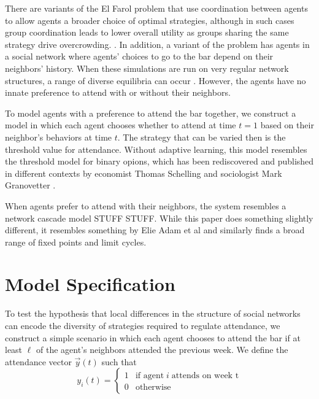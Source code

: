 \documentclass[12pt]{article}
\begin{document}
There are variants of the El Farol problem that use coordination between agents to allow agents a broader choice of optimal strategies, although in such cases group coordination leads to lower overall utility as groups sharing the same strategy drive overcrowding. \cite{collins:2017} \cite{wilensky:2015}.  In addition, a variant of the problem has agents in a social network where agents' choices to go to the bar depend on their neighbors' history.   When these simulations are run on very regular network structures, a range of diverse equilibria can occur \cite{chen:2012}.  However, the agents have no innate preference to attend with or without their neighbors.

To model agents with a preference to attend the bar together, we construct a model in which each agent chooses whether to attend at time $t = 1$ based on their neighbor's behaviors at time $t$.  The strategy that can be varied then is the threshold value for attendance.  Without adaptive learning, this model resembles the threshold model for binary opions, which has been rediscovered and published in different contexts by economist Thomas Schelling \cite{schelling:1978} and sociologist Mark Granovetter \cite{granovetter:1978} \cite{grabish:2020}.







When agents prefer to attend with their neighbors, the system resembles a network cascade model STUFF STUFF.  While this paper does something slightly different, it resembles something by Elie Adam et al \cite{adam:2012} and similarly finds a broad range of fixed points and limit cycles.

\section{Model Specification}
To test the hypothesis that local differences in the structure of social networks can encode the diversity of strategies required to regulate attendance, we construct a simple scenario in which each agent chooses to attend the bar if at least $\ell$ of the agent's neighbors attended the previous week.  We define the attendance vector $\vec{y}(t)$ such that
\begin{equation}
  y_i(t) = \begin{cases}
    1 &\text{if agent}\; i \; \text{attends on week t} \\
    0 &\text{otherwise}
  \end{cases}
\end{equation}
\end{document}
